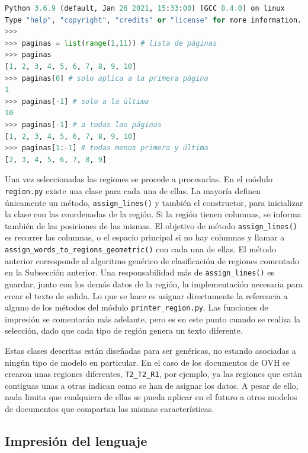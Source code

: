 \begin{lstlisting}[language=Python,caption={Selección de regiones según las páginas},label=lst:seleccion-de-regiones-segun-pagina]
Python 3.6.9 (default, Jan 26 2021, 15:33:00) [GCC 8.4.0] on linux
Type "help", "copyright", "credits" or "license" for more information.
>>>
>>> paginas = list(range(1,11)) # lista de páginas
>>> paginas
[1, 2, 3, 4, 5, 6, 7, 8, 9, 10]
>>> paginas[0] # solo aplica a la primera página
1
>>> paginas[-1] # solo a la última
10
>>> paginas[-1] # a todas las páginas
[1, 2, 3, 4, 5, 6, 7, 8, 9, 10]
>>> paginas[1:-1] # todas menos primera y última
[2, 3, 4, 5, 6, 7, 8, 9]
\end{lstlisting}

Una vez seleccionadas las regiones se procede a procesarlas. En el módulo \verb|region.py| existe una clase para cada una de ellas. La mayoría definen únicamente un método, \verb|assign_lines()| y también el constructor, para inicializar la clase con las coordenadas de la región. Si la región tienen columnas, se informa también de las posiciones de las mismas. El objetivo de método \verb|assign_lines()| es recorrer las columnas, o el espacio principal si no hay columnas y llamar a \verb|assign_words_to_regions_geometric()| con cada una de ellas. El método anterior corresponde al algoritmo genérico de clasificación de regiones comentado en la Subsección anterior. Una responsabilidad más de \verb|assign_lines()| es guardar, junto con los demás datos de la región, la implementación necesaria para crear el texto de salida. Lo que se hace es asignar directamente la referencia a alguno de los métodos del módulo \verb|printer_region.py|. Las funciones de impresión se comentarán más adelante, pero es en este punto cuando se realiza la selección, dado que cada tipo de región genera un texto diferente.

Estas clases descritas están diseñadas para ser genéricas, no estando asociadas a ningún tipo de modelo en particular. En el caso de los documentos de OVH se crearon unas regiones diferentes, \verb|T2_T2_R1|, por ejemplo, ya las regiones que están contiguas unas a otras indican como se han de asignar los datos. A pesar de ello, nada limita que cualquiera de ellas se pueda aplicar en el futuro a otros modelos de documentos que compartan las mismas características.

\subsection{Impresión del lenguaje}

